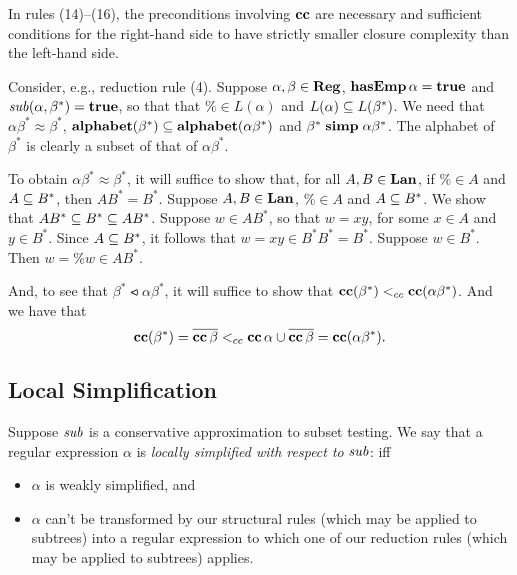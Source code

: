 In rules (14)--(16), the preconditions involving $\mathbf{cc}$ are necessary
and sufficient conditions for the right-hand side to have strictly
smaller closure complexity than the left-hand side.

Consider, e.g., reduction rule (4). Suppose $\alpha, \beta\in\mathbf{Reg}$,
$\mathbf{hasEmp}\,\alpha=\mathbf{true}$ and ${\it sub}(\alpha,\beta^*)=\mathbf{true}$, so that that
$\%\in L(\alpha)$ and $L(\alpha)\subseteq L(\beta^*)$.  We need that
$\alpha\beta^* \approx \beta^*$,
$\mathbf{alphabet}(\beta^*)\subseteq\mathbf{alphabet}(\alpha\beta^*)$ and
$\beta^*\mathrel{\mathbf{simp}}\alpha\beta^*$.  The alphabet of $\beta^*$ is clearly a
subset of that of $\alpha\beta^*$.

To obtain $\alpha\beta^* \approx \beta^*$, it will suffice to show
that, for all $A,B\in\mathbf{Lan}$, if $\%\in A$ and $A\subseteq B^*$, then
$AB^*=B^*$.  Suppose $A,B\in\mathbf{Lan}$, $\%\in A$ and $A\subseteq B^*$.
We show that $AB^*\subseteq B^*\subseteq AB^*$.  Suppose $w\in AB^*$, so
that $w=xy$, for some $x\in A$ and $y\in B^*$.  Since $A\subseteq B^*$,
it follows that $w=xy\in B^*B^*=B^*$.  Suppose $w\in B^*$.
Then $w=\%w\in AB^*$.

And, to see that $\beta^*\ltcc\alpha\beta^*$, it will suffice to
show that $\mathbf{cc}(\beta^*)\mathrel{<_{cc}}\mathbf{cc}(\alpha\beta^*)$.  And we
have that
\begin{displaymath}
 \mathbf{cc}(\beta^*) = \overline{\mathbf{cc}\,\beta} \mathrel{<_{cc}}
 \mathbf{cc}\,\alpha \cup \overline{\mathbf{cc}\,\beta} = \mathbf{cc}(\alpha\beta^*) .
\end{displaymath}

\subsection*{Local Simplification}

%
%
%

Suppose ${\it sub}$ is a conservative approximation to subset testing.
%
We say that a regular expression $\alpha$ is \emph{locally simplified with
respect to} ${\it sub}$:
iff
\begin{itemize}
\item $\alpha$ is weakly simplified, and

\item $\alpha$ can't be transformed by our structural rules (which may
  be applied to subtrees) into a regular expression to which one of
  our reduction rules (which may be applied to subtrees) applies.
\end{itemize}


